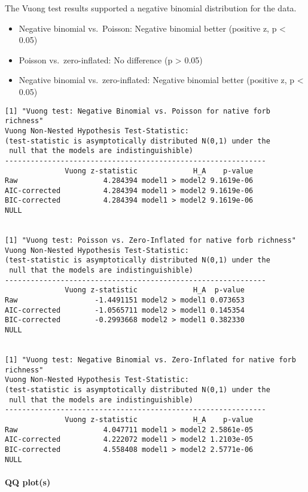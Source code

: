 \documentclass[
  letterpaper,
  DIV=11,
  numbers=noendperiod]{scrartcl}
\makeatletter
\let\oldparagraph\paragraph
\renewcommand{\paragraph}{
    \@ifstar
      \xxxParagraphStar
      \xxxParagraphNoStar
  }
\newcommand{\xxxParagraphStar}[1]{\oldparagraph*{#1}\mbox{}}
\newcommand{\xxxParagraphNoStar}[1]{\oldparagraph{#1}\mbox{}}
\makeatother
\begin{document}
The Vuong test results supported a negative binomial distribution for
the data.

\begin{itemize}
\item
  Negative binomial vs.~Poisson: Negative binomial better (positive z, p
  \textless{} 0.05)
\item
  Poisson vs.~zero-inflated: No difference (p \textgreater{} 0.05)
\item
  Negative binomial vs.~zero-inflated: Negative binomial better
  (positive z, p \textless{} 0.05)
\end{itemize}

\begin{verbatim}
[1] "Vuong test: Negative Binomial vs. Poisson for native forb richness"
Vuong Non-Nested Hypothesis Test-Statistic: 
(test-statistic is asymptotically distributed N(0,1) under the
 null that the models are indistinguishible)
-------------------------------------------------------------
              Vuong z-statistic             H_A    p-value
Raw                    4.284394 model1 > model2 9.1619e-06
AIC-corrected          4.284394 model1 > model2 9.1619e-06
BIC-corrected          4.284394 model1 > model2 9.1619e-06
NULL


[1] "Vuong test: Poisson vs. Zero-Inflated for native forb richness"
Vuong Non-Nested Hypothesis Test-Statistic: 
(test-statistic is asymptotically distributed N(0,1) under the
 null that the models are indistinguishible)
-------------------------------------------------------------
              Vuong z-statistic             H_A  p-value
Raw                  -1.4491151 model2 > model1 0.073653
AIC-corrected        -1.0565711 model2 > model1 0.145354
BIC-corrected        -0.2993668 model2 > model1 0.382330
NULL


[1] "Vuong test: Negative Binomial vs. Zero-Inflated for native forb richness"
Vuong Non-Nested Hypothesis Test-Statistic: 
(test-statistic is asymptotically distributed N(0,1) under the
 null that the models are indistinguishible)
-------------------------------------------------------------
              Vuong z-statistic             H_A    p-value
Raw                    4.047711 model1 > model2 2.5861e-05
AIC-corrected          4.222072 model1 > model2 1.2103e-05
BIC-corrected          4.558408 model1 > model2 2.5771e-06
NULL
\end{verbatim}

\paragraph{\texorpdfstring{\textbf{QQ
plot(s)}}{QQ plot(s)}}\label{qq-plots-1}
\end{document}
